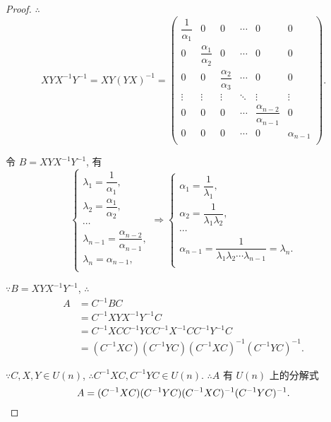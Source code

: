 \documentclass[color=black,device=normal,lang=cn,mode=geye]{elegantnote}
\begin{document}
\begin{proof}
    $\therefore$
    \[XYX^{-1}Y^{-1}=XY(YX)^{-1}=\begin{pmatrix}
        \dfrac{1}{\alpha_1} & 0 & 0 & \cdots & 0 & 0 \\
        0 & \dfrac{\alpha_1}{\alpha_2} & 0 & \cdots & 0 & 0 \\
        0 & 0 & \dfrac{\alpha_2}{\alpha_3} & \cdots & 0 & 0 \\
        \vdots & \vdots & \vdots & \ddots & \vdots & \vdots \\
        0 & 0 & 0 & \cdots & \dfrac{\alpha_{n-2}}{\alpha_{n-1}} & 0 \\
        0 & 0 & 0 & \cdots & 0 & \alpha_{n-1} \\
    \end{pmatrix}.\]

    令 $B=XYX^{-1}Y^{-1}$, 有
    \[\begin{cases}
        \lambda_1=\dfrac{1}{\alpha_1}, \\[8pt]
        \lambda_2=\dfrac{\alpha_1}{\alpha_2}, \\
        \cdots \\
        \lambda_{n-1}=\dfrac{\alpha_{n-2}}{\alpha_{n-1}}, \\
        \lambda_n=\alpha_{n-1}, \\
    \end{cases}\Rightarrow\begin{cases}
        \alpha_1=\dfrac{1}{\lambda_1}, \\[8pt]
        \alpha_2=\dfrac{1}{\lambda_1\lambda_2}, \\
        \cdots \\
        \alpha_{n-1}=\dfrac{1}{\lambda_1\lambda_2\cdots\lambda_{n-1}}=\lambda_n. \\
    \end{cases}\]

    $\because B=XYX^{-1}Y^{-1}$, $\therefore$
    \begin{align*}
        A & =C^{-1}BC \\
        & =C^{-1}XYX^{-1}Y^{-1}C \\
        & =C^{-1}XCC^{-1}YCC^{-1}X^{-1}CC^{-1}Y^{-1}C \\
        & =(C^{-1}XC)(C^{-1}YC)(C^{-1}XC)^{-1}(C^{-1}YC)^{-1}.
    \end{align*}

    $\because C,X,Y\in U(n)$, $\therefore C^{-1}XC,C^{-1}YC\in U(n)$. $\therefore A$ 有 $U(n)$ 上的分解式
    \[A=(C^{-1}XC)(C^{-1}YC)(C^{-1}XC)^{-1}(C^{-1}YC)^{-1}.\qedhere\]
\end{proof}
\end{document}
